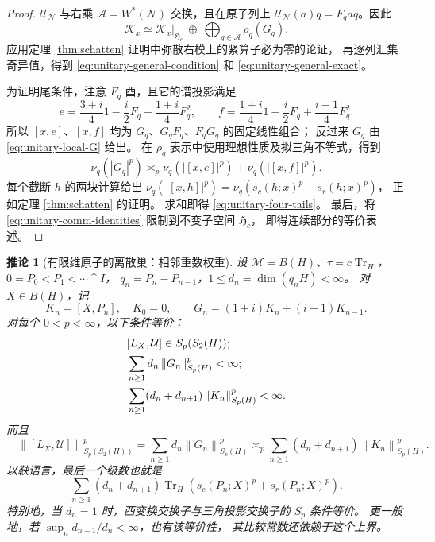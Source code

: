 \documentclass[UTF8,11pt,a4paper,fontset=fandol]{ctexart}
\newtheorem{corollary}[theorem]{推论}
\theoremstyle{remark}
\numberwithin{equation}{section}
\newcommand{\M}{\mathcal M}
\newcommand{\N}{\mathcal N}
\newcommand{\HH}{\mathfrak H}
\newcommand{\Tr}{\operatorname{Tr}}
\newcommand{\norm}[1]{\left\lVert #1\right\rVert}
\begin{document}
\begin{proof}
$\mathcal U_\N$ 与右乘 $\mathcal A=W^*(\N)$ 交换，且在原子列上
$\mathcal U_\N(a)q=F_qaq$。因此
\[
 \mathcal K_x\simeq\mathcal K_x|_{\HH_c}
   \ \oplus\ \bigoplus_{q\in\mathscr A}\rho_q(G_q).
\]
应用定理 \ref{thm:schatten} 证明中弥散右模上的紧算子必为零的论证，
再逐列汇集奇异值，得到 \eqref{eq:unitary-general-condition}
和 \eqref{eq:unitary-general-exact}。

为证明尾条件，注意 $F_q$ 酉，且它的谱投影满足
\[
 e=\frac{3+i}{4}1-\frac i2F_q+\frac{1+i}{4}F_q^2,\qquad
 f=\frac{1+i}{4}1-\frac i2F_q+\frac{i-1}{4}F_q^2.
\]
所以 $[x,e]$、$[x,f]$ 均为 $G_q$、$G_qF_q$、$F_qG_q$ 的固定线性组合；
反过来 $G_q$ 由 \eqref{eq:unitary-local-G} 给出。
在 $\rho_q$ 表示中使用理想性质及拟三角不等式，得到
\[
 \nu_q(|G_q|^p)\asymp_p
 \nu_q(|[x,e]|^p)+\nu_q(|[x,f]|^p).
\]
每个截断 $h$ 的两块计算给出
$\nu_q(|[x,h]|^p)=\nu_q(s_c(h;x)^p+s_r(h;x)^p)$，
正如定理 \ref{thm:schatten} 的证明。
求和即得 \eqref{eq:unitary-four-tails}。
最后，将 \eqref{eq:unitary-comm-identities} 限制到不变子空间 $\HH_c$，
即得连续部分的等价表述。
\end{proof}

\begin{corollary}[有限维原子的离散巢：相邻重数权重]\label{cor:unitary-discrete}
设 $\M=B(H)$、$\tau=c\Tr_H$，
$0=P_0<P_1<\cdots\uparrow I$，
$q_n=P_n-P_{n-1}$，$1\leq d_n=\dim(q_nH)<\infty$。
对 $X\in B(H)$，记
\[
 K_n=[X,P_n],\quad K_0=0,\qquad
 G_n=(1+i)K_n+(i-1)K_{n-1}.
\]
对每个 $0<p<\infty$，以下条件等价：
\begin{align}
 &[L_X,\mathcal U]\in S_p(S_2(H));\notag\\
 &\sum_{n\geq1}d_n\norm{G_n}_{S_p(H)}^p<\infty;
       \label{eq:unitary-discrete-exact-condition}\\
 &\sum_{n\geq1}(d_n+d_{n+1})\norm{K_n}_{S_p(H)}^p<\infty.
       \label{eq:unitary-discrete-balanced}
\end{align}
而且
\begin{equation}\label{eq:unitary-discrete-norm}
 \boxed{\quad
 \norm{[L_X,\mathcal U]}_{S_p(S_2(H))}^p
 =\sum_{n\geq1}d_n\norm{G_n}_{S_p(H)}^p
 \asymp_p\sum_{n\geq1}(d_n+d_{n+1})\norm{K_n}_{S_p(H)}^p.
 \quad}
\end{equation}
以鞅语言，最后一个级数也就是
\[
 \sum_{n\geq1}(d_n+d_{n+1})\Tr_H\!\left(
 s_c(P_n;X)^p+s_r(P_n;X)^p\right).
\]
特别地，当 $d_n=1$ 时，酉变换交换子与三角投影交换子的 $S_p$ 条件等价。
更一般地，若 $\sup_n d_{n+1}/d_n<\infty$，也有该等价性，
其比较常数还依赖于这个上界。
\end{corollary}
\end{document}
